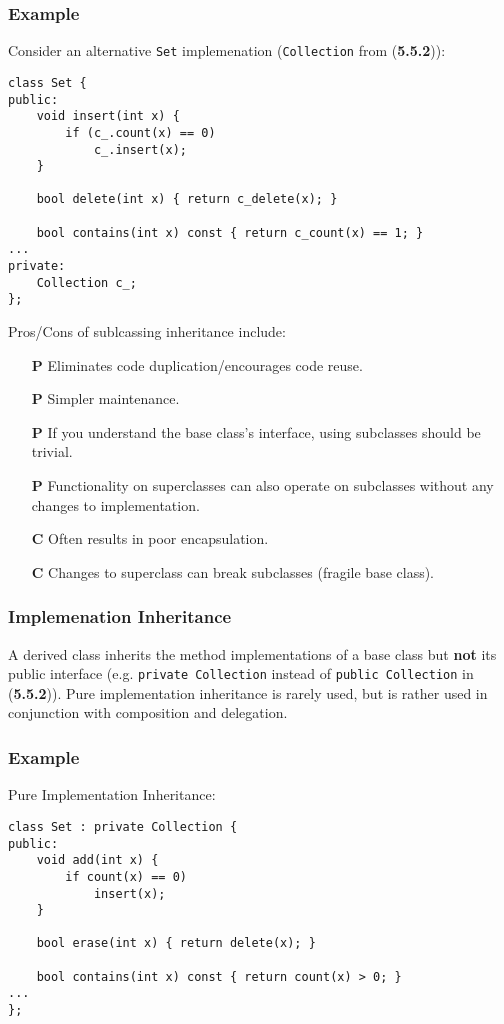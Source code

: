 \documentclass{article}
\begin{document}
\subsubsection*{Example}
Consider an alternative \texttt{Set} implemenation
(\texttt{Collection} from (\textbf{5.5.2})):
\begin{verbatim}
class Set {
public:
    void insert(int x) {
        if (c_.count(x) == 0)
            c_.insert(x);
    }

    bool delete(int x) { return c_delete(x); }

    bool contains(int x) const { return c_count(x) == 1; }
...
private:
    Collection c_;
};
\end{verbatim}
Pros/Cons of sublcassing inheritance include:
\begin{enumerate}
\item [\textbf{P}] Eliminates code duplication/encourages code reuse.
\item [\textbf{P}] Simpler maintenance.
\item [\textbf{P}] If you understand the base class's interface, using
  subclasses should be trivial.
\item [\textbf{P}] Functionality on superclasses can also operate on
  subclasses without any changes to implementation.
\item [\textbf{C}] Often results in poor encapsulation.
\item [\textbf{C}] Changes to superclass can break subclasses (fragile
  base class).
\end{enumerate}

\subsubsection{Implemenation Inheritance}
A derived class inherits the method implementations of a base class
but \textbf{not} its public interface (e.g. \texttt{private
  Collection} instead of \texttt{public Collection} in
(\textbf{5.5.2})). Pure implementation inheritance is rarely used, but
is rather used in conjunction with composition and delegation.

\subsubsection*{Example}
Pure Implementation Inheritance:
\begin{verbatim}
class Set : private Collection {
public:
    void add(int x) {
        if count(x) == 0)
            insert(x);
    }

    bool erase(int x) { return delete(x); }

    bool contains(int x) const { return count(x) > 0; }
...
};
\end{verbatim}
\newpage
\end{document}
